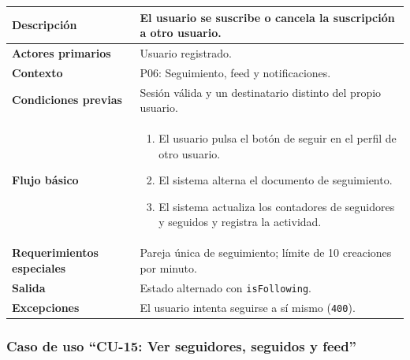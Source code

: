 \documentclass[doc,12pt,a4paper]{apa7}
\begin{document}
\begin{longtable}{|P{3.3cm}|L{11.2cm}|}
\hline
\textbf{Descripción} & El usuario se suscribe o cancela la suscripción a otro usuario. \\ \hline
\textbf{Actores primarios} & Usuario registrado. \\ \hline
\textbf{Contexto} & P06: Seguimiento, feed y notificaciones. \\ \hline
\textbf{Condiciones previas} & Sesión válida y un destinatario distinto del propio usuario. \\ \hline
\textbf{Flujo básico} &
\begin{enumerate}
    \item El usuario pulsa el botón de seguir en el perfil de otro usuario.
    \item El sistema alterna el documento de seguimiento.
    \item El sistema actualiza los contadores de seguidores y seguidos y registra la actividad.
\end{enumerate} \\ \hline
\textbf{Requerimientos especiales} & Pareja única de seguimiento; límite de 10 creaciones por minuto. \\ \hline
\textbf{Salida} & Estado alternado con \texttt{isFollowing}. \\ \hline
\textbf{Excepciones} & El usuario intenta seguirse a sí mismo (\texttt{400}). \\ \hline
\end{longtable}

\subsubsection{Caso de uso ``CU-15: Ver seguidores, seguidos y feed''}
\end{document}
